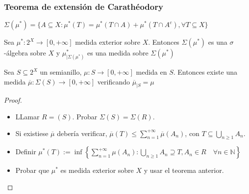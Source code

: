  \begin{frame}\frametitle{Teorema de extensión de Carathéodory}
  \begin{definition}
  $\Sigma(\mu^\ast) = \{A\subseteq X: \mu^\ast(T) = \mu^\ast(T\cap A) + \mu^\ast(T\cap A^c), \forall T\subseteq X\}$
  \end{definition}
  \begin{theorem}
   Sea $\mu^\ast : 2^X \rightarrow [0, +\infty]$ medida exterior sobre $X$. Entonces $\Sigma(\mu^\ast)$
   es una $\sigma$-álgebra sobre $X$ y $\mu^\ast_{|\Sigma(\mu^\ast)}$ es una medida sobre $\Sigma(\mu^\ast)$
  \end{theorem}
 
  \begin{theorem}
   Sea $S \subseteq 2^X$ un semianillo, $\mu:S \rightarrow [0,+\infty]$ medida en $S$. Entonces existe
   una medida $\overline{\mu}:\Sigma(S) \rightarrow [0,+\infty]$ verificando $\overline{\mu}_{|S} = \mu$
   \label{th:caratheodory}
  \end{theorem}
 
 \begin{proof}
  \begin{itemize}
   \item LLamar $R=(S)$. Probar $\Sigma(S) = \Sigma(R)$.
  
   \item Si existiese $\overline{\mu}$ debería verificar, $\overline{\mu}(T) \le \sum_{n=1}^{+\infty} \overline{\mu}(A_n)$, 
    con $T \subseteq \bigcup_{n\ge 1} A_n$.
  
   \item Definir $\mu^\ast(T):= \inf\left\{\sum_{n=1}^{+\infty} \mu(A_n): \bigcup_{n\ge 1} A_n \supseteq T,
                   A_n\in R \quad \forall n\in\mathbb{N}\right\}$
   \item Probar que $\mu^\ast$ es medida exterior sobre $X$ y usar el teorema anterior.
  \end{itemize}
 \end{proof}
 \end{frame}  
 

